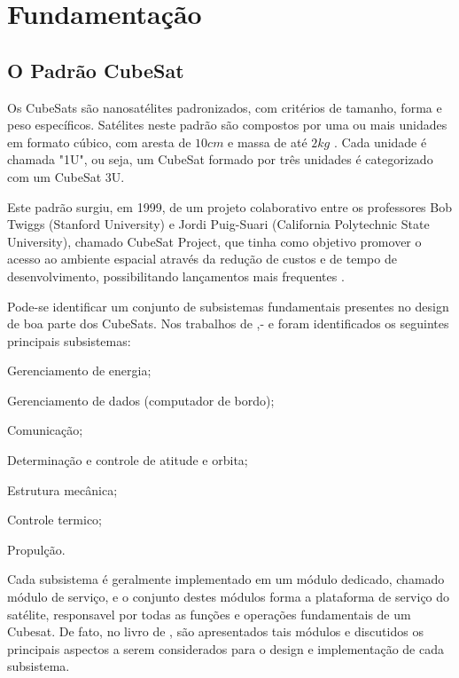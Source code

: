 \chapter{Fundamentação}\label{cap:fundamentacao}

\section{O Padrão CubeSat}\label{sec:cubesats}

Os CubeSats são nanosatélites padronizados, com critérios de tamanho, forma e peso específicos.
Satélites neste padrão são compostos por uma ou mais unidades em formato cúbico, com aresta de \(10cm\) e massa de até \(2kg\) \cite{cds}.
Cada unidade é chamada "1U", ou seja, um CubeSat formado por três unidades é categorizado com um CubeSat 3U.

Este padrão surgiu, em 1999, de um projeto colaborativo entre os professores Bob Twiggs (Stanford University) e Jordi Puig-Suari (California Polytechnic State University), chamado CubeSat Project, que tinha como objetivo promover o acesso ao ambiente espacial através da redução de custos e de tempo de desenvolvimento, possibilitando lançamentos mais frequentes \cite{cds}.

Pode-se identificar um conjunto de subsistemas fundamentais presentes no design de boa parte dos 
CubeSats. Nos trabalhos de \textcite{tailoring-ecss-nanosat},- \textcite{survey-nanosat-missions-2010} e \textcite{reliability-of-cubesats} foram identificados os seguintes principais subsistemas:
\begin{alineas}
    \item Gerenciamento de energia;
    \item Gerenciamento de dados (computador de bordo);
    \item Comunicação;
    \item Determinação e controle de atitude e orbita;
    \item Estrutura mecânica;
    \item Controle termico;
    \item Propulção.
\end{alineas}

Cada subsistema é geralmente implementado em um módulo dedicado, chamado módulo de serviço, e o conjunto destes módulos forma a plataforma de serviço do satélite, responsavel por todas as funções e operações fundamentais de um Cubesat.
De fato,  no livro de \textcite{cappelletti_2020}, são apresentados tais módulos e discutidos os principais aspectos a serem considerados para o design e implementação de cada subsistema.

